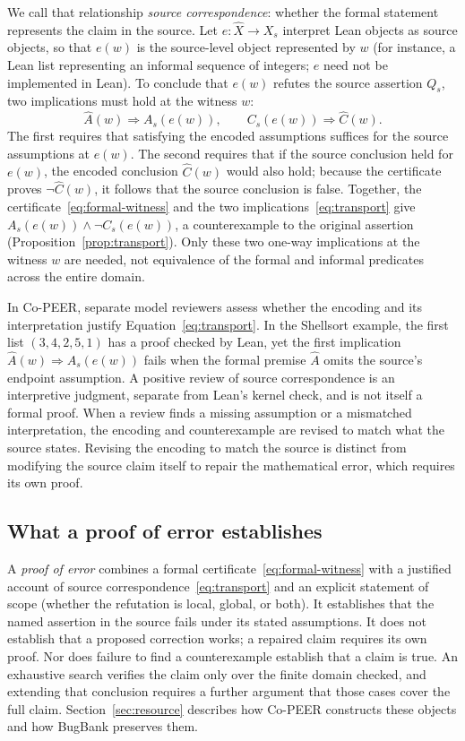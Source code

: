 We call that relationship \emph{source correspondence}: whether the formal statement represents the claim in the source. Let $e:\widehat X\to X_s$ interpret Lean objects as source objects, so that $e(w)$ is the source-level object represented by $w$ (for instance, a Lean list representing an informal sequence of integers; $e$ need not be implemented in Lean). To conclude that $e(w)$ refutes the source assertion $Q_s$, two implications must hold at the witness $w$:
\begin{equation}
\widehat A(w)\Rightarrow A_s(e(w)),\qquad
C_s(e(w))\Rightarrow\widehat C(w).
\label{eq:transport}
\end{equation}
The first requires that satisfying the encoded assumptions suffices for the source assumptions at $e(w)$. The second requires that if the source conclusion held for $e(w)$, the encoded conclusion $\widehat C(w)$ would also hold; because the certificate proves $\neg\widehat C(w)$, it follows that the source conclusion is false. Together, the certificate~\eqref{eq:formal-witness} and the two implications~\eqref{eq:transport} give $A_s(e(w))\wedge\neg C_s(e(w))$, a counterexample to the original assertion (Proposition~\ref{prop:transport}). Only these two one-way implications at the witness $w$ are needed, not equivalence of the formal and informal predicates across the entire domain.

In Co-PEER, separate model reviewers assess whether the encoding and its interpretation justify Equation~\eqref{eq:transport}. In the Shellsort example, the first list $(3,4,2,5,1)$ has a proof checked by Lean, yet the first implication $\widehat A(w)\Rightarrow A_s(e(w))$ fails when the formal premise $\widehat A$ omits the source's endpoint assumption. A positive review of source correspondence is an interpretive judgment, separate from Lean's kernel check, and is not itself a formal proof. When a review finds a missing assumption or a mismatched interpretation, the encoding and counterexample are revised to match what the source states. Revising the encoding to match the source is distinct from modifying the source claim itself to repair the mathematical error, which requires its own proof.

\subsection{What a proof of error establishes}
A \emph{proof of error} combines a formal certificate~\eqref{eq:formal-witness} with a justified account of source correspondence~\eqref{eq:transport} and an explicit statement of scope (whether the refutation is local, global, or both). It establishes that the named assertion in the source fails under its stated assumptions. It does not establish that a proposed correction works; a repaired claim requires its own proof. Nor does failure to find a counterexample establish that a claim is true. An exhaustive search verifies the claim only over the finite domain checked, and extending that conclusion requires a further argument that those cases cover the full claim. Section~\ref{sec:resource} describes how Co-PEER constructs these objects and how BugBank preserves them.
